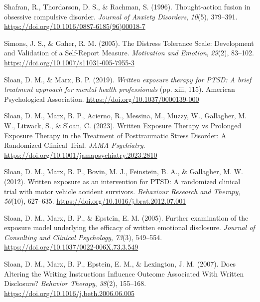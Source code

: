 \documentclass[
  man,floatsintext]{apa7}
\newlength{\cslhangindent}
\newlength{\cslentryspacingunit} %
\newenvironment{CSLReferences}[2] %
 {%
  \setlength{\parindent}{0pt}
  \ifodd #1
  \let\oldpar\par
  \def\par{\hangindent=\cslhangindent\oldpar}
  \fi
  \setlength{\parskip}{#2\cslentryspacingunit}
 }%
 {}
\begin{document}
\begin{CSLReferences}{1}{0}
\leavevmode{}%
Shafran, R., Thordarson, D. S., \& Rachman, S. (1996). Thought-action fusion in obsessive compulsive disorder. \emph{Journal of Anxiety Disorders}, \emph{10}(5), 379--391. \url{https://doi.org/10.1016/0887-6185(96)00018-7}

\leavevmode{}%
Simons, J. S., \& Gaher, R. M. (2005). The Distress Tolerance Scale: Development and Validation of a Self-Report Measure. \emph{Motivation and Emotion}, \emph{29}(2), 83--102. \url{https://doi.org/10.1007/s11031-005-7955-3}

\leavevmode{}%
Sloan, D. M., \& Marx, B. P. (2019). \emph{Written exposure therapy for PTSD: A brief treatment approach for mental health professionals} (pp. xiii, 115). American Psychological Association. \url{https://doi.org/10.1037/0000139-000}

\leavevmode{}%
Sloan, D. M., Marx, B. P., Acierno, R., Messina, M., Muzzy, W., Gallagher, M. W., Litwack, S., \& Sloan, C. (2023). Written Exposure Therapy vs Prolonged Exposure Therapy in the Treatment of Posttraumatic Stress Disorder: A Randomized Clinical Trial. \emph{JAMA Psychiatry}. \url{https://doi.org/10.1001/jamapsychiatry.2023.2810}

\leavevmode{}%
Sloan, D. M., Marx, B. P., Bovin, M. J., Feinstein, B. A., \& Gallagher, M. W. (2012). Written exposure as an intervention for PTSD: A randomized clinical trial with motor vehicle accident survivors. \emph{Behaviour Research and Therapy}, \emph{50}(10), 627--635. \url{https://doi.org/10.1016/j.brat.2012.07.001}

\leavevmode{}%
Sloan, D. M., Marx, B. P., \& Epstein, E. M. (2005). Further examination of the exposure model underlying the efficacy of written emotional disclosure. \emph{Journal of Consulting and Clinical Psychology}, \emph{73}(3), 549--554. \url{https://doi.org/10.1037/0022-006X.73.3.549}

\leavevmode{}%
Sloan, D. M., Marx, B. P., Epstein, E. M., \& Lexington, J. M. (2007). Does Altering the Writing Instructions Influence Outcome Associated With Written Disclosure? \emph{Behavior Therapy}, \emph{38}(2), 155--168. \url{https://doi.org/10.1016/j.beth.2006.06.005}


\end{CSLReferences}
\end{document}
